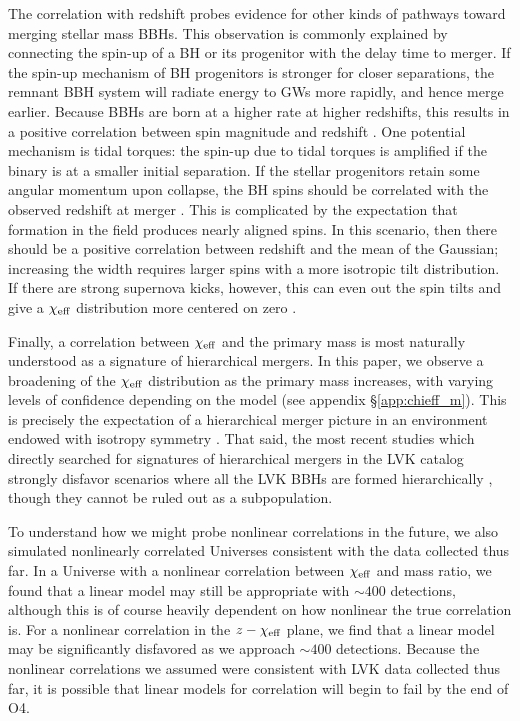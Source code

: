 \documentclass[%
 reprint,
 amsmath,amssymb,
 aps,
 prd,
]{revtex4-2}
\newcommand{\chieff}{\chi_{\rm eff}}
\begin{document}
The correlation with redshift probes evidence for other kinds of pathways toward merging stellar mass BBHs. This observation is commonly explained by connecting the spin-up of a BH or its progenitor with the delay time to merger. If the spin-up mechanism of BH progenitors is stronger for closer separations, the remnant \ac{BBH} system will radiate energy to GWs more rapidly, and hence merge earlier. Because \acp{BBH} are born at a higher rate at higher redshifts, this results in a positive correlation between spin magnitude and redshift \cite{Zaldarriaga:2017qkw,Bavera:2020inc,Bavera:2021evk,Fuller:2022ysb}. One potential mechanism is tidal torques: the spin-up due to tidal torques is amplified if the binary is at a smaller initial separation. If the stellar progenitors retain some angular momentum upon collapse, the BH spins should be correlated with the observed redshift at merger \cite{Qin:2018vaa, Fuller:2019sxi, Bavera:2022mef}. This is complicated by the expectation that formation in the field produces nearly aligned spins. In this scenario, then there should be a positive correlation between redshift and the mean of the Gaussian; increasing the width requires larger spins with a more isotropic tilt distribution. If there are strong supernova kicks, however, this can even out the spin tilts and give a $\chieff$ distribution more centered on zero \cite{Rodriguez:2016vmx, Gerosa:2018wbw, Callister:2020vyz, Stevenson:2022hmi}.

Finally, a correlation between $\chieff$ and the primary mass is most naturally understood as a signature of hierarchical mergers. In this paper, we observe a broadening of the $\chieff$ distribution as the primary mass increases, with varying levels of confidence depending on the model (see appendix \S \ref{app:chieff_m}). This is precisely the expectation of a hierarchical merger picture in an environment endowed with isotropy symmetry \cite{Gerosa:2021mno, Gerosa:2017kvu, Fishbach:2017dwv, Tagawa:2021ofj}. That said, the most recent studies which directly searched for signatures of hierarchical mergers in the \ac{LVK} catalog strongly disfavor scenarios where all the \ac{LVK} BBHs are formed hierarchically \cite{Fishbach:2022lzq, Doctor:2019ruh, Kimball:2020opk}, though they cannot be ruled out as a subpopulation.

To understand how we might probe nonlinear correlations in the future, we also simulated nonlinearly correlated Universes consistent with the data collected thus far. In a Universe with a nonlinear correlation between $\chieff$ and mass ratio, we found that a linear model may still be appropriate with $\sim 400$ detections, although this is of course heavily dependent on how nonlinear the true correlation is. For a nonlinear correlation in the $z-\chieff$ plane, we find that a linear model may be significantly disfavored as we approach $\sim 400$ detections. Because the nonlinear correlations we assumed were consistent with \ac{LVK} data collected thus far, it is possible that linear models for correlation will begin to fail by the end of O4. 
\end{document}
